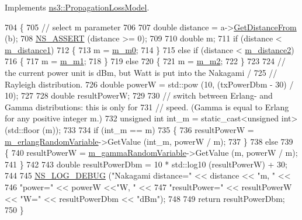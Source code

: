 Implements \hyperlink{classns3_1_1PropagationLossModel_aa6bb73e4132dc5d8e1b49750955838bb}{ns3\+::\+Propagation\+Loss\+Model}.


\begin{DoxyCode}
704 \{
705   \textcolor{comment}{// select m parameter}
706 
707   \textcolor{keywordtype}{double} distance = a->\hyperlink{classns3_1_1MobilityModel_afa16c20b3c5fd135be075000f0272f31}{GetDistanceFrom} (b);
708   \hyperlink{assert_8h_a6dccdb0de9b252f60088ce281c49d052}{NS\_ASSERT} (distance >= 0);
709 
710   \textcolor{keywordtype}{double} m;
711   \textcolor{keywordflow}{if} (distance < \hyperlink{classns3_1_1NakagamiPropagationLossModel_a4066585afe1a07e79bfc70bd64f06b80}{m\_distance1})
712     \{
713       m = \hyperlink{classns3_1_1NakagamiPropagationLossModel_a188d8e524f49ac1dfcb56b7788807e6c}{m\_m0};
714     \}
715   \textcolor{keywordflow}{else} \textcolor{keywordflow}{if} (distance < \hyperlink{classns3_1_1NakagamiPropagationLossModel_a5b352f7546d5eb117c80bcc09fb76bca}{m\_distance2})
716     \{
717       m = \hyperlink{classns3_1_1NakagamiPropagationLossModel_aa233b3621162f0f006ca8d00ffb14bd6}{m\_m1};
718     \}
719   \textcolor{keywordflow}{else}
720     \{
721       m = \hyperlink{classns3_1_1NakagamiPropagationLossModel_ac4d82f72fb23d6cc852de0348c686fc2}{m\_m2};
722     \}
723 
724   \textcolor{comment}{// the current power unit is dBm, but Watt is put into the Nakagami /}
725   \textcolor{comment}{// Rayleigh distribution.}
726   \textcolor{keywordtype}{double} powerW = std::pow (10, (txPowerDbm - 30) / 10);
727 
728   \textcolor{keywordtype}{double} resultPowerW;
729 
730   \textcolor{comment}{// switch between Erlang- and Gamma distributions: this is only for}
731   \textcolor{comment}{// speed. (Gamma is equal to Erlang for any positive integer m.)}
732   \textcolor{keywordtype}{unsigned} \textcolor{keywordtype}{int} int\_m = \textcolor{keyword}{static\_cast<}\textcolor{keywordtype}{unsigned} \textcolor{keywordtype}{int}\textcolor{keyword}{>}(std::floor (m));
733 
734   \textcolor{keywordflow}{if} (int\_m == m)
735     \{
736       resultPowerW = \hyperlink{classns3_1_1NakagamiPropagationLossModel_a0aac232ec149639051fd334436ea03b4}{m\_erlangRandomVariable}->GetValue (int\_m, powerW / m);
737     \}
738   \textcolor{keywordflow}{else}
739     \{
740       resultPowerW = \hyperlink{classns3_1_1NakagamiPropagationLossModel_a2674c7bd999e9c22176a606a1acc7ae1}{m\_gammaRandomVariable}->GetValue (m, powerW / m);
741     \}
742 
743   \textcolor{keywordtype}{double} resultPowerDbm = 10 * std::log10 (resultPowerW) + 30;
744 
745   \hyperlink{group__logging_ga413f1886406d49f59a6a0a89b77b4d0a}{NS\_LOG\_DEBUG} (\textcolor{stringliteral}{"Nakagami distance="} << distance << \textcolor{stringliteral}{"m, "} <<
746                 \textcolor{stringliteral}{"power="} << powerW <<\textcolor{stringliteral}{"W, "} <<
747                 \textcolor{stringliteral}{"resultPower="} << resultPowerW << \textcolor{stringliteral}{"W="} << resultPowerDbm << \textcolor{stringliteral}{"dBm"});
748 
749   \textcolor{keywordflow}{return} resultPowerDbm;
750 \}
\end{DoxyCode}


